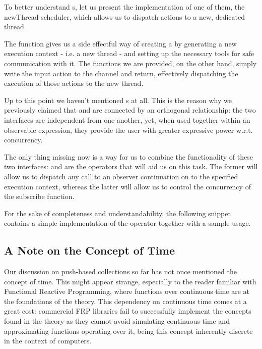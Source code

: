 To better understand s, let us present the implementation of one of them, the newThread scheduler, which allows us to dispatch actions to a new, dedicated thread.


The  function gives us a side effectful way of creating a  by generating a new execution context - i.e. a new thread - and setting up the necessary tools for safe communication with it. The  functions we are provided, on the other hand, simply write the input  action to the channel and return, effectively dispatching the execution of those actions to the new thread. 

Up to this point we haven't mentioned s at all. This is the reason why we previously claimed that  and  are connected by an orthogonal relationship: the two interfaces are independent from one another, yet, when used together within an observable expression, they provide the user with greater expressive power w.r.t. concurrency. 

The only thing missing now is a way for us to combine the functionality of these two interfaces:  and  are the operators that will aid us on this task. The former will allow us to dispatch any call to an observer continuation on to the specified execution context, whereas the latter will allow us to control the concurrency of the  subscribe function.

For the sake of completeness and understandability, the following snippet contains a simple implementation of the  operator together with a sample usage.



\subsection{A Note on the Concept of Time}

Our discussion on push-based collections so far has not once mentioned the concept of time. This might appear strange, especially to the reader familiar with Functional Reactive Programming, where functions over continuous time are at the foundations of the theory. This dependency on continuous time comes at a great cost: commercial FRP libraries fail to successfully implement the concepts found in the theory\cite{elliott2014denotational} as they cannot avoid simulating continuous time and approximating functions operating over it, being this concept inherently discrete in the context of computers.

